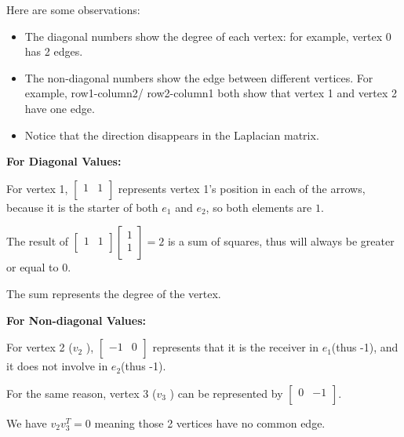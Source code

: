 \begin{example}
    Here are some observations:
    \begin{itemize}
        \item The diagonal numbers show the degree of each vertex: for example, vertex 0 has 2 edges.
        \item The non-diagonal numbers show the edge between different vertices. For example, row1-column2/ row2-column1 both show that vertex 1 and vertex 2 have one edge.
        \item Notice that the direction disappears in the Laplacian matrix.
    \end{itemize}

    \textbf{For Diagonal Values: }

    For vertex 1, \(\begin{bmatrix}
        1 &  1 \\
    \end{bmatrix}\) represents vertex 1's position in each of the arrows, because it is the starter of both \(e_1\) and \(e_2\), so both elements are \(1\).  

    The result of \(\begin{bmatrix}
        1 &  1 \\
    \end{bmatrix} 
    \begin{bmatrix}
         1 \\
         1 \\
    \end{bmatrix}
    = 2\) 
    is a sum of squares, thus will always be greater or equal to 0. 

    The sum represents the degree of the vertex.

    \textbf{For Non-diagonal Values: }

    For vertex 2 (\(v_2\) ), \(\begin{bmatrix}
        -1 &  0 \\
    \end{bmatrix}\) represents that it is the receiver in \(e_1\)(thus -1), and it does not involve in \(e_2\)(thus -1).  

    For the same reason, vertex 3 (\(v_3\) ) can be represented by \(\begin{bmatrix}
        0 &  -1 \\
    \end{bmatrix}\).

    We have \(v_2 v_3^T = 0\) meaning those 2 vertices have no common edge.  
\end{example}

